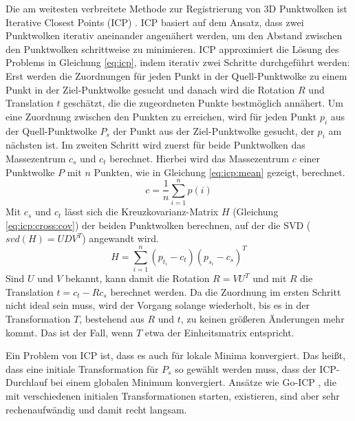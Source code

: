 \documentclass[12pt,titlepage, twoside]{article}
\begin{document}
Die am weitesten verbreitete Methode zur Registrierung von 3D Punktwolken ist Iterative Closest Points (ICP) \cite{icp_org}. 
ICP basiert auf dem Ansatz, dass zwei Punktwolken iterativ aneinander angenähert werden, um den Abstand zwischen den Punktwolken schrittweise zu minimieren. 
ICP approximiert die Lösung des Problems in Gleichung \ref{eq:icp}, indem iterativ zwei Schritte durchgeführt werden: 
Erst werden die Zuordnungen für jeden Punkt in der Quell-Punktwolke zu einem Punkt in der Ziel-Punktwolke gesucht und danach wird die Rotation $R$ und Translation $t$ geschätzt, die die zugeordneten Punkte bestmöglich annähert.
Um eine Zuordnung zwischen den Punkten zu erreichen, wird für jeden Punkt $p_i$ aus der Quell-Punktwolke $P_s$ der Punkt aus der Ziel-Punktwolke gesucht, der $p_i$ am nächsten ist. 
Im zweiten Schritt wird zuerst für beide Punktwolken das Massezentrum $c_s$ und $c_t$ berechnet. Hierbei wird das Massezentrum $c$ einer Punktwolke $P$ mit $n$ Punkten, wie in Gleichung \ref{eq:icp:mean} gezeigt, berechnet.
\begin{equation}
    \label{eq:icp:mean}
    c = \frac{1}{n}\sum_{i=1}^n{p(i)}
\end{equation}
Mit $c_s$ und $c_t$ lässt sich die Kreuzkovarianz-Matrix $H$ (Gleichung \ref{eq:icp:cross:cov}) der beiden Punktwolken berechnen, auf der die SVD ($svd(H) = UDV^T$) angewandt wird.
\begin{equation}
    \label{eq:icp:cross:cov}
    H = \sum_{i=1}^n{(p_{t_i} - c_t)(p_{s_i} - c_s)^T}
\end{equation}
Sind $U$ und $V$ bekannt, kann damit die Rotation $R = VU^T$ und mit $R$ die Translation $t=c_t-Rc_s$ berechnet werden.
Da die Zuordnung im ersten Schritt nicht ideal sein muss, wird der Vorgang solange wiederholt, bis es in der Transformation $T$, bestehend aus $R$ und $t$, zu keinen größeren Änderungen mehr kommt.
Das ist der Fall, wenn $T$ etwa der Einheitsmatrix entspricht.

Ein Problem von ICP ist, dass es auch für lokale Minima konvergiert. Das heißt, dass eine initiale Transformation für $P_s$ so gewählt werden muss, dass der ICP-Durchlauf bei einem globalen Minimum konvergiert.
Ansätze wie Go-ICP \cite{GoICP}, die mit verschiedenen initialen Transformationen starten, existieren, sind aber sehr rechenaufwändig und damit recht langsam.
\end{document}

